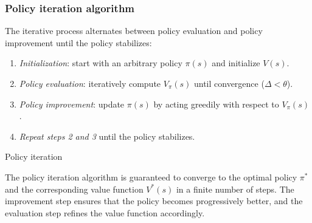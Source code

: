 \subsubsection{Policy iteration algorithm}
The iterative process alternates between policy evaluation and policy improvement until the policy stabilizes: 
\begin{enumerate}
    \item \textit{Initialization}: start with an arbitrary policy $\pi(s)$ and initialize $V(s)$.
    \item \textit{Policy evaluation}: iteratively compute $V_\pi(s)$ until convergence ($\Delta<\theta$).
    \item \textit{Policy improvement}: update $\pi(s)$ by acting greedily with respect to $V_\pi(s)$.
    \item \textit{Repeat steps 2 and 3} until the policy stabilizes.
\end{enumerate}
\begin{algorithm}[H]
    \caption{Policy iteration}
        \begin{algorithmic}[1]
             
            \Repeat
                \Repeat {}
                \EndFor
                \Until{$\Delta<\theta$}
                 
                    \EndIf
                \EndFor 
            \State{}
        \end{algorithmic}
\end{algorithm}
The policy iteration algorithm is guaranteed to converge to the optimal policy $\pi^\ast$ and the corresponding value function $V^\ast(s)$ in a finite number of steps. 
The improvement step ensures that the policy becomes progressively better, and the evaluation step refines the value function accordingly.

